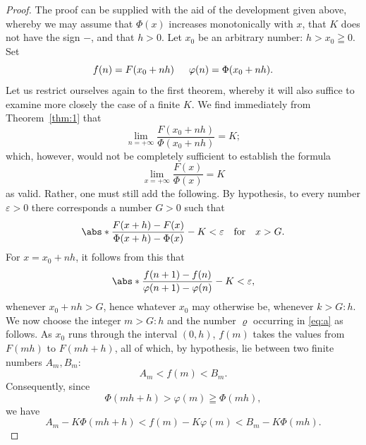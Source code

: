 \documentclass[a4paper]{amsbook}
\begin{document}
\begin{proof}
  The proof can be supplied with the aid of the development given above, whereby we may assume that \(\Phi(x)\) increases monotonically with \(x\), that \(K\) does not have the sign \(-\), and that \(h > 0\).  Let \(x_0\) be an arbitrary number: \(h > x_0 \geqq 0\).  Set
  \begin{equation*}
    f(n) = F(x_0+nh)
    \hspace{1.5em}
    \varphi(n) = \Phi(x_0+nh).
  \end{equation*}
  Let us restrict ourselves again to the first theorem, whereby it will also suffice to examine more closely the case of a finite \(K\).  We find immediately from Theorem~\ref{thm:1} that
  \begin{equation*}
    \lim_{n=+\infty} \frac{F(x_0+nh)}{\Phi (x_0+nh)} = K;
  \end{equation*}
  which, however, would not be completely sufficient to establish the formula
  \begin{equation*}
    \lim_{x=+\infty} \frac{F(x)}{\Phi (x)} = K
  \end{equation*}
  as valid.  Rather, one must still add the following.  By hypothesis, to every number \(\varepsilon > 0\) there corresponds a number \(G > 0\) such that
  \begin{equation}
    \label{eq:d}
    \abs*{\frac{F(x+h)-F(x)}{\Phi (x+h)-\Phi (x)}-K} < \varepsilon
    \qfor
    x>G.
  \end{equation}
  For \(x = x_0 + nh\), it follows from this that
  \begin{equation*}
    \abs*{\frac{f(n+1)-f(n)}{\varphi (n+1)-\varphi (n)}-K} < \varepsilon,
  \end{equation*}
  whenever \(x_0 + nh > G\), hence whatever \(x_0\) may otherwise be, whenever \(k > G : h\).  We now choose the integer \(m > G : h\) and the number \(\varrho\) occurring in \eqref{eq:a} as follows.  As \(x_0\) runs through the interval \((0, h)\), \(f(m)\) takes the values from \(F(mh)\) to \(F(mh + h)\), all of which, by hypothesis, lie between two finite numbers \(A_m, B_m\):
  \begin{equation*}
    A_m < f(m) < B_m.
  \end{equation*}
  Consequently, since
  \begin{equation*}
    \Phi (mh+h) > \varphi(m) \geqq \Phi(mh),
  \end{equation*}
  we have
  \begin{equation*}
    A_m - K\Phi(mh+h) < f(m) - K\varphi(m) < B_m - K\Phi(mh).

\end{equation*}
\end{proof}
\end{document}
